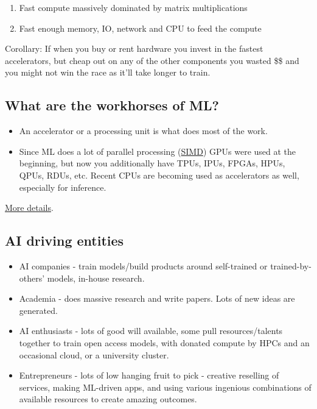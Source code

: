 \documentclass[
]{report}
\providecommand{\tightlist}{%
  \setlength{\itemsep}{0pt}\setlength{\parskip}{0pt}}\usepackage{longtable,booktabs,array}
\begin{document}
\begin{enumerate}
\def\labelenumi{\arabic{enumi}.}
\tightlist
\item
  Fast compute massively dominated by matrix multiplications
\item
  Fast enough memory, IO, network and CPU to feed the compute
\end{enumerate}

Corollary: If when you buy or rent hardware you invest in the fastest
accelerators, but cheap out on any of the other components you wasted
\$\$ and you might not win the race as it'll take longer to train.

\subsection{What are the workhorses of
ML?}\label{what-are-the-workhorses-of-ml}

\begin{itemize}
\item
  An accelerator or a processing unit is what does most of the work.
\item
  Since ML does a lot of parallel processing
  (\href{https://en.wikipedia.org/wiki/Single_instruction,_multiple_data}{SIMD})
  GPUs were used at the beginning, but now you additionally have TPUs,
  IPUs, FPGAs, HPUs, QPUs, RDUs, etc. Recent CPUs are becoming used as
  accelerators as well, especially for inference.
\end{itemize}

\href{../compute/accelerator}{More details}.

\subsection{AI driving entities}\label{ai-driving-entities}

\begin{itemize}
\tightlist
\item
  AI companies - train models/build products around self-trained or
  trained-by-others' models, in-house research.
\item
  Academia - does massive research and write papers. Lots of new ideas
  are generated.
\item
  AI enthusiasts - lots of good will available, some pull
  resources/talents together to train open access models, with donated
  compute by HPCs and an occasional cloud, or a university cluster.
\item
  Entrepreneurs - lots of low hanging fruit to pick - creative reselling
  of services, making ML-driven apps, and using various ingenious
  combinations of available resources to create amazing outcomes.
\end{itemize}
\end{document}
